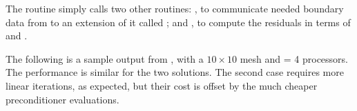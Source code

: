 The  routine simply calls two other routines: ,
to communicate needed boundary data from  to an extension of it called
; and , to compute the residuals in terms of
 and .

The following is a sample output from , with a $10 \times 10$
mesh and  = 4 processors.  The performance is similar for the two
solutions.  The second case requires more linear iterations, as expected, 
but their cost is offset by the much cheaper preconditioner evaluations.


